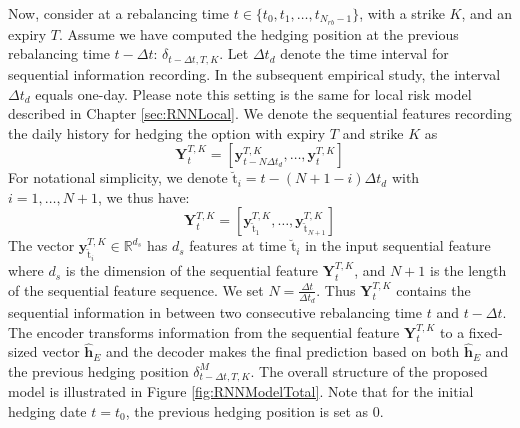 \documentclass[letterpaper,12pt,titlepage,oneside,final]{book}
\numberwithin{equation}{section}
\theoremstyle{definition}
\newcommand{\vy}{\mathbf{y}}
\newcommand{\DT}{\Delta t}
\newcommand{\Real}{\mathbb{R}}
\newcommand{\nt}{\breve{\text{t}}}
\begin{document}
Now, consider at a  rebalancing time $t \in \{t_0,t_1, \dots, t_{N_{rb}-1}\}$, with a strike $K$, and an expiry $T$. Assume we have computed the hedging position at the previous rebalancing time $t-\Delta t$: $\delta_{t-\Delta t, T,K}$. Let $\DT_{d}$ denote the time interval for sequential information recording. In  the subsequent empirical study, the interval $\DT_{d}$ equals one-day. Please note this setting is the same for local risk model described in Chapter \ref{sec:RNNLocal}.  We denote the sequential features recording the daily history  for hedging the option with expiry $T$ and strike $K$ as
\[
\mathbf{Y}_{t}^{T,K}=\left[\vy^{T,K}_{t-N \DT_{d}},\dots,\vy^{T,K}_{t}\right]
\]
For notational simplicity, we denote $\nt_i=t-(N+1-i)\DT_d$ with $i=1, \dots,N+1$, we thus have:
\[
\mathbf{Y}_{t}^{T,K}=\left[\vy^{T,K}_{\nt_{1}},\dots,\vy^{T,K}_{\nt_{N+1}}\right]
\]
The vector $\vy^{T,K}_{\nt_{i}} \in \Real^{d_s}$ has  $d_s$ features at time $\nt_{i}$ in the input sequential feature where
 $d_s$ is the dimension of the sequential feature $\mathbf{Y}_{t}^{T,K}$, and
$N+1$ is the length of the sequential feature sequence. We set $N=\frac{\Delta t}{\Delta t_d}$. Thus $\mathbf{Y}_{t}^{T,K}$ contains the sequential information in between two consecutive rebalancing time $t$ and $t-\Delta t$.
The encoder transforms information from the sequential feature $\mathbf{Y}_{t}^{T,K}$ to  a fixed-sized vector
$\mathbf{\widehat{h}}_E$   and the decoder makes the final prediction based on both $\mathbf{\widehat{h}}_E$  and the previous hedging position $\delta^{M}_{t-\Delta t,T,K}$. The overall structure of the proposed model is illustrated in Figure \ref{fig:RNNModelTotal}. Note that for the initial hedging date $t=t_0$, the previous hedging position is set as $0$.
\end{document}
